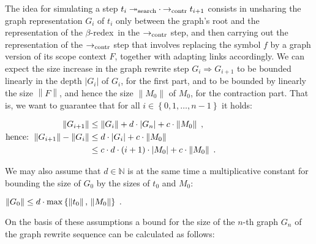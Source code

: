 \documentclass[
submission
]{dmtcs-episciences-tampered}
\newcommand{\iap}[2]{#1 _{#2}}
\newcommand{\indap}[2]{#1 _{#2}}
\newcommand{\nb}{\nobreakdash}
\newcommand{\nf}{\normalfont}
\newcommand{\punc}[1]{\ensuremath{\hspace*{3pt}{#1}}}
\newcommand{\setexp}[1]{\left\{{#1}\right\}}
\newcommand{\nat}{\mathbb{N}}
\newcommand{\bter}{t}
\newcommand{\bteri}{\indap{\bter}}
\newcommand{\afoscopesym}{f}
\newcommand{\afoscopecxt}{F}
\newcommand{\sdepth}{\text{\nf d}}
\newcommand{\depth}[1]{\lvert{#1}\rvert} \newcommand{\depthbig}[1]{\big\lvert{#1}\big\rvert} \newcommand{\sudepth}{\indap{\sdepth}{\text{\nf u}}}
\newcommand{\size}[1]{\left\lVert{#1}\right\rVert}
\newcommand{\alter}{M}
\newcommand{\alteri}{\indap{\alter}}
\newcommand{\sred}{\to}
\newcommand{\sredi}{\indap{\sred}}
\newcommand{\smred}{\twoheadrightarrow}
\newcommand{\smredi}{\indap{\smred}}
\newcommand{\scriptsearch}{\text{\nf search}}
\newcommand{\scriptcontract}{\text{\nf contr}}
\newcommand{\ssearchmred}{\smredi{\scriptsearch}}
\newcommand{\scontractred}{\sredi{\scriptcontract}}
\newcommand{\scomprewrels}[2]{{#1}\cdot{#2}}
\newcommand{\comprewrels}[2]{\mathrel{\scomprewrels{#1}{#2}}}
\newcommand{\betaredex}{$\beta$\nb-re\-dex}
\newcommand{\agraph}{G}
\newcommand{\agraphi}{\iap{\agraph}}
\newcommand{\sgraphred}{{\Longrightarrow}}
\newcommand{\graphred}{\mathrel{\sgraphred}}
\theoremstyle{plain}
\theoremstyle{definition}
\begin{document}
The idea for simulating a step $\bteri{i} \comprewrels{\ssearchmred}{\scontractred} \bteri{i+1}$
consists in unsharing the graph representation $\agraphi{i}$ of $\bteri{i}$ only 
between the graph's root and the representation of the \betaredex\ in the $\scontractred$ step,
and then carrying out the representation of the $\scontractred$ step that involves   
replacing the symbol $\afoscopesym$ by a graph version of its scope context $\afoscopecxt$,
together with adapting links accordingly. 
We can expect the size increase in the graph rewrite step $\agraphi{i} \graphred \agraphi{i+1}$ 
to be bounded linearly in the depth $\depth{\agraphi{i}}$ of $\agraphi{i}$, for the first part,
and to be bounded by linearly the size $\size{\afoscopecxt}$, and hence the size $\size{\alteri{0}}$ of $\alteri{0}$,
for the contraction part.   
That is, we want to guarantee that for all $i\in\setexp{0,1,\ldots,n-1}$ it holds:
\begin{center}
  $
\begin{aligned}
  \size{\agraphi{i+1}} & {} \le \size{\agraphi{i}} + d \cdot \depth{\agraphi{n}} + c \cdot \size{\alteri{0}} \punc{,}
  \\
    \text{hence: } 
  \size{\agraphi{i+1}} - \size{\agraphi{i}} & {} \le d \cdot \depth{\agraphi{i}}  + c \cdot \size{\alteri{0}}
                                            \\      
                                            & {} \le c \cdot d \cdot (i+1) \cdot \depth{\alteri{0}} 
                                                     + c \cdot \size{\alteri{0}} \punc{.}    
\end{aligned}
  $
\end{center}  
We may also assume that $d\in\nat$ is at the same time a multiplicative constant for bounding
the size of $\agraphi{0}$ by the sizes of $\bteri{0}$ and $\alteri{0}$:
\begin{center}
  $
  \size{\agraphi{0}} \le d \cdot \max \setexp{ \size{\bteri{0}}, \, \size{\alteri{0}} } \punc{.} 
  $
\end{center}  
On the basis of these assumptions a bound for the size of the $n$\nb-th graph $\agraphi{n}$
of the graph rewrite sequence can be calculated as follows:
\end{document}
